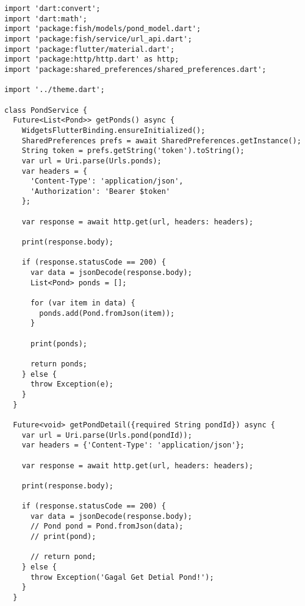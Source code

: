 	\begin{lstlisting}
import 'dart:convert';
import 'dart:math';
import 'package:fish/models/pond_model.dart';
import 'package:fish/service/url_api.dart';
import 'package:flutter/material.dart';
import 'package:http/http.dart' as http;
import 'package:shared_preferences/shared_preferences.dart';

import '../theme.dart';

class PondService {
  Future<List<Pond>> getPonds() async {
    WidgetsFlutterBinding.ensureInitialized();
    SharedPreferences prefs = await SharedPreferences.getInstance();
    String token = prefs.getString('token').toString();
    var url = Uri.parse(Urls.ponds);
    var headers = {
      'Content-Type': 'application/json',
      'Authorization': 'Bearer $token'
    };

    var response = await http.get(url, headers: headers);

    print(response.body);

    if (response.statusCode == 200) {
      var data = jsonDecode(response.body);
      List<Pond> ponds = [];

      for (var item in data) {
        ponds.add(Pond.fromJson(item));
      }

      print(ponds);

      return ponds;
    } else {
      throw Exception(e);
    }
  }

  Future<void> getPondDetail({required String pondId}) async {
    var url = Uri.parse(Urls.pond(pondId));
    var headers = {'Content-Type': 'application/json'};

    var response = await http.get(url, headers: headers);

    print(response.body);

    if (response.statusCode == 200) {
      var data = jsonDecode(response.body);
      // Pond pond = Pond.fromJson(data);
      // print(pond);

      // return pond;
    } else {
      throw Exception('Gagal Get Detial Pond!');
    }
  }


\end{lstlisting}
